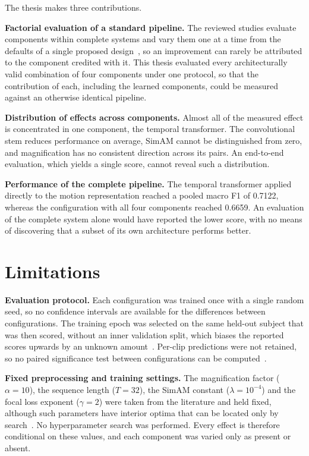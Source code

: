 The thesis makes three contributions.

\textbf{Factorial evaluation of a standard pipeline.} The reviewed studies evaluate components within complete systems and vary them one at a time from the defaults of a single proposed design~\cite{liX2018,xia2020b,zhang2022}, so an improvement can rarely be attributed to the component credited with it. This thesis evaluated every architecturally valid combination of four components under one protocol, so that the contribution of each, including the learned components, could be measured against an otherwise identical pipeline.

\textbf{Distribution of effects across components.} Almost all of the measured effect is concentrated in one component, the temporal transformer. The convolutional stem reduces performance on average, SimAM cannot be distinguished from zero, and magnification has no consistent direction across its pairs. An end-to-end evaluation, which yields a single score, cannot reveal such a distribution.

\textbf{Performance of the complete pipeline.} The temporal transformer applied directly to the motion representation reached a pooled macro F1 of 0.7122, whereas the configuration with all four components reached 0.6659. An evaluation of the complete system alone would have reported the lower score, with no means of discovering that a subset of its own architecture performs better.


\section{Limitations}
\label{sec:ch6-limitations}

\textbf{Evaluation protocol.} Each configuration was trained once with a single random seed, so no confidence intervals are available for the differences between configurations. The training epoch was selected on the same held-out subject that was then scored, without an inner validation split, which biases the reported scores upwards by an unknown amount~\cite{varma2006}. Per-clip predictions were not retained, so no paired significance test between configurations can be computed~\cite{mcnemar1947}.

\textbf{Fixed preprocessing and training settings.} The magnification factor ($\alpha = 10$), the sequence length ($T = 32$), the SimAM constant ($\lambda = 10^{-4}$) and the focal loss exponent ($\gamma = 2$) were taken from the literature and held fixed, although such parameters have interior optima that can be located only by search~\cite{liX2018,ben2021}. No hyperparameter search was performed. Every effect is therefore conditional on these values, and each component was varied only as present or absent.

